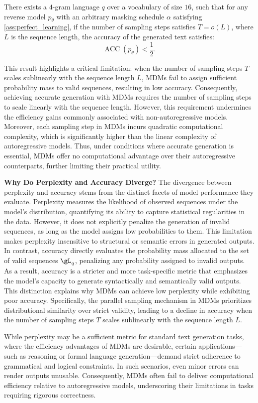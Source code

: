 \begin{theorem}
    \label{thm:negtive}
    There exists a $4$-gram language $q$ over a vocabulary of size $16$, such that for any reverse model $p_\mathsf{\theta}$ with an arbitrary masking schedule $\alpha$ satisfying \cref{ass:perfect_learning}, if the number of sampling steps satisfies $T = o(L)$, where $L$ is the sequence length, the accuracy of the generated text satisfies:
    \begin{equation*}
        \operatorname{ACC}(p_\mathsf{\theta}) < \frac{1}{2}.
    \end{equation*}
\end{theorem}

This result highlights a critical limitation: when the number of sampling steps $T$ scales sublinearly with the sequence length $L$, MDMs fail to assign sufficient probability mass to valid sequences, resulting in low accuracy. Consequently, achieving accurate generation with MDMs requires the number of sampling steps to scale linearly with the sequence length. However, this requirement undermines the efficiency gains commonly associated with non-autoregressive models. Moreover, each sampling step in MDMs incurs quadratic computational complexity, which is significantly higher than the linear complexity of autoregressive models. Thus, under conditions where accurate generation is essential, MDMs offer no computational advantage over their autoregressive counterparts, further limiting their practical utility.

\textbf{Why Do Perplexity and Accuracy Diverge?}  
The divergence between perplexity and accuracy stems from the distinct facets of model performance they evaluate. Perplexity measures the likelihood of observed sequences under the model’s distribution, quantifying its ability to capture statistical regularities in the data. However, it does not explicitly penalize the generation of invalid sequences, as long as the model assigns low probabilities to them. This limitation makes perplexity insensitive to structural or semantic errors in generated outputs. In contrast, accuracy directly evaluates the probability mass allocated to the set of valid sequences $\gL_q$, penalizing any probability assigned to invalid outputs. As a result, accuracy is a stricter and more task-specific metric that emphasizes the model's capacity to generate syntactically and semantically valid outputs. This distinction explains why MDMs can achieve low perplexity while exhibiting poor accuracy. Specifically, the parallel sampling mechanism in MDMs prioritizes distributional similarity over strict validity, leading to a decline in accuracy when the number of sampling steps $T$ scales sublinearly with the sequence length $L$. 

While perplexity may be a sufficient metric for standard text generation tasks, where the efficiency advantages of MDMs are desirable, certain applications—such as reasoning or formal language generation—demand strict adherence to grammatical and logical constraints. In such scenarios, even minor errors can render outputs unusable. Consequently, MDMs often fail to deliver computational efficiency relative to autoregressive models, underscoring their limitations in tasks requiring rigorous correctness.